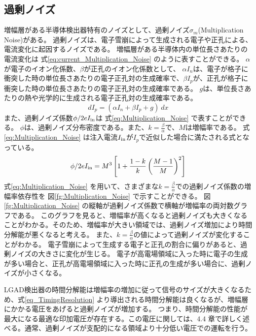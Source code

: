 \subsection{過剰ノイズ}
増幅層がある半導体検出器特有のノイズとして、過剰ノイズ$\sigma_m$(Multiplication Noise)がある。
過剰ノイズは、電子雪崩によって生成される電子や正孔による、電流変化に起因するノイズである。
増幅層がある半導体内の単位長さあたりの電流変化は 式\ref{eq:current_Multiplication_Noise} のように表すことができる\cite{1363388845924852224}。
$\alpha$が電子のイオン化係数、$\beta$が正孔のイオン化係数として、
$\alpha I_n$は、電子が格子に衝突した時の単位長さあたりの電子正孔対の生成確率で、$\beta I_p$が、正孔が格子に衝突した時の単位長さあたりの電子正孔対の生成確率である。
$g$は、単位長さあたりの熱や光学的に生成される電子正孔対の生成確率である。
\begin{equation}
    dI_p=(\alpha I_n + \beta I_p + g)\:dx
    \label{eq:current_Multiplication_Noise}
\end{equation}
また、過剰ノイズ係数$\phi/{2eI_{\rm{{in}}}}$は 式\ref{eq:Multiplication_Noise} で表すことができる\cite{1363388845924852224}。
$\phi$は、過剰ノイズ分布密度である。また、$k=\frac{\beta}{\alpha}$で、$M$は増幅率である。
式\ref{eq:Multiplication_Noise} は注入電流$I_{\rm{{in}}}$が$I_p$で近似した場合に満たされる式となっている。
\begin{equation}
    \phi/{2eI_{\rm{in}}}=M^3 \left[1+\frac{1-k}{k}\left(\frac{M-1}{M}\right)^2 \right]
    \label{eq:Multiplication_Noise}
\end{equation}
式\ref{eq:Multiplication_Noise} を用いて、さまざまな$k=\frac{\beta}{\alpha}$での過剰ノイズ係数の増幅率依存性を 図\ref{fg:Multiplication_Noise} で示すことができる。
図\ref{fg:Multiplication_Noise} の縦軸が過剰ノイズ係数で横軸が増幅率の両対数グラフである。
このグラフを見ると、増幅率が高くなると過剰ノイズも大きくなることがわかる。そのため、増幅率が大きい領域では、過剰ノイズ増加により時間分解能が悪くなると考える。
また、$k=\frac{\beta}{\alpha}$の値によって過剰ノイズが変化することがわかる。
電子雪崩によって生成する電子と正孔の割合に偏りがあると、過剰ノイズの大きさに変化が生じる。
電子が高電場領域に入った時に電子の生成が多い場合と、正孔が高電場領域に入った時に正孔の生成が多い場合に、過剰ノイズが小さくなる。

LGAD検出器の時間分解能は増幅率の増加に従って信号のサイズが大きくなるため、式\ref{eq_TimingResolution} より導出される時間分解能は良くなるが、増幅層にかかる電圧をあげると過剰ノイズが増加する。
つまり、時間分解能の性能が最大になる最適な印加電圧が存在する。この電圧に関しては、4.4 章で詳しく述べる。通常、過剰ノイズが支配的になる領域より十分低い電圧での運転を行う。


